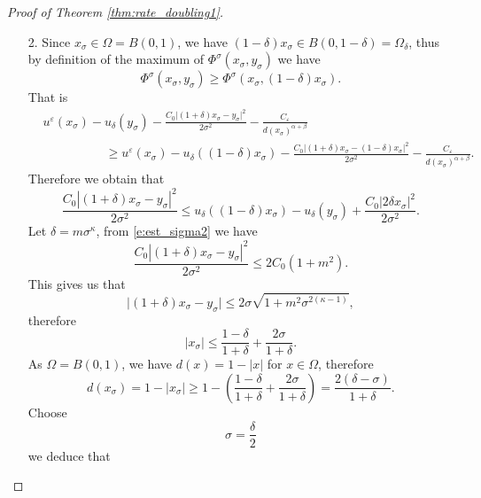 \documentclass[11pt,reqno]{amsart}
\numberwithin{figure}{section}
\theoremstyle{plain}
\theoremstyle{remark}
\numberwithin{equation}{section}
\begin{document}
\begin{proof}[Proof of Theorem \ref{thm:rate_doubling1}]
\begin{enumerate}
\item[2.] Since $x_\sigma\in \Omega = B(0,1)$, we have $(1-\delta)x_\sigma \in B(0,1-\delta) = \Omega_\delta$, thus by definition of the maximum of $\Phi^\sigma(x_\sigma,y_\sigma)$ we have
\begin{equation*}
    \Phi^\sigma(x_\sigma,y_\sigma) \geq \Phi^\sigma(x_\sigma, (1-\delta) x_\sigma).
\end{equation*}
That is
\begin{align*}
    &u^\varepsilon(x_\sigma) - u_\delta(y_\sigma) - \frac{C_0\big|(1+\delta)x_\sigma - y_\sigma \big|^2}{2\sigma^2} - \frac{C_\varepsilon}{d(x_\sigma)^{\alpha+\beta}}\\
    &\qquad\qquad\quad \geq  u^\varepsilon(x_\sigma) - u_\delta((1-\delta)x_\sigma) - \frac{C_0\big|(1+\delta)x_\sigma - (1-\delta)x_\sigma \big|^2}{2\sigma^2} - \frac{C_\varepsilon}{d(x_\sigma)^{\alpha+\beta}}.
\end{align*}
Therefore we obtain that
    \begin{equation}\label{e:est_sigma2}
     \frac{C_0|(1+\delta)x_\sigma-y_\sigma|^2}{2\sigma^2} \leq u_\delta((1-\delta)x_\sigma) - u_\delta(y_\sigma) + \frac{C_0|2\delta x_\sigma|^2}{2\sigma^2}. 
    \end{equation}
    Let $\delta = m \sigma^\kappa$, from \eqref{e:est_sigma2} we have
    \begin{equation}\label{e:est_sigma3n}
        \frac{C_0|(1+\delta)x_\sigma-y_\sigma|^2}{2\sigma^2}  \leq 2C_0(1+m^2).
    \end{equation}
    This gives us that
    \begin{equation}\label{e:est_snow}
      \big|(1+\delta)x_\sigma - y_\sigma\big|   \leq 2\sigma\sqrt{1+m^2\sigma^{2(\kappa-1)}},
    \end{equation}
    therefore
    \begin{equation}\label{e:e2}
     |x_\sigma| \leq \frac{1-\delta}{1+\delta} + \frac{2\sigma}{1+\delta}.
    \end{equation}
    As $\Omega = B(0,1)$, we have $d(x) = 1-|x|$ for $x\in \Omega$, therefore
    \begin{equation*}
        d(x_\sigma) = 1- |x_\sigma| \geq 1 - \left(\frac{1-\delta}{1+\delta} + \frac{2\sigma}{1+\delta}\right) = \frac{2(\delta - \sigma)}{1+\delta}.
    \end{equation*}
    Choose 
    \begin{equation}\label{e:scale_sigma}
        \sigma = \frac{\delta}{2}
    \end{equation}
    we deduce that

\end{enumerate}
\end{proof}
\end{document}
